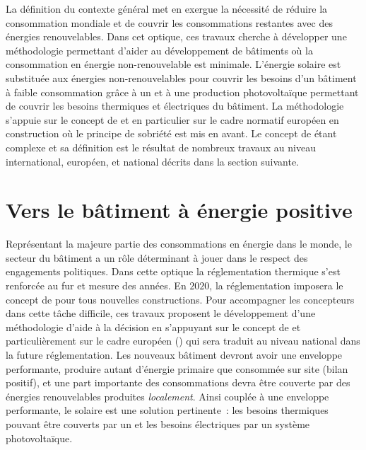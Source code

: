 La définition du contexte général met en exergue la nécessité de réduire la consommation
mondiale et de couvrir les consommations restantes avec des énergies renouvelables. Dans
cet optique, ces travaux cherche à développer une méthodologie permettant d’aider au
développement de bâtiments où la consommation en énergie non-renouvelable est minimale.
L’énergie solaire est substituée aux énergies non-renouvelables pour couvrir les besoins
d’un bâtiment à faible consommation grâce à un  et à une production
photovoltaïque permettant de couvrir les besoins thermiques et électriques du bâtiment. La
méthodologie s’appuie sur le concept de  et en particulier sur le cadre
normatif européen en construction où le principe de sobriété est mis en avant. Le concept
de  étant complexe et sa définition est le résultat de nombreux travaux au
niveau international, européen, et national décrits dans la section suivante.





\section{Vers le bâtiment à énergie positive} %
\label{sec:vers_le_batiment_a_energie_positive}
Représentant la majeure partie des consommations en énergie dans le monde, le secteur
du bâtiment a un rôle déterminant à jouer dans le respect des engagements politiques.
Dans cette optique la réglementation thermique s’est renforcée au fur et mesure des années.
En $2020$, la réglementation imposera le concept de  pour tous
nouvelles constructions.
Pour accompagner les concepteurs dans cette tâche difficile, ces travaux proposent le
développement d’une méthodologie d’aide à la décision en s’appuyant sur le concept de
 et particulièrement sur le cadre européen () qui sera
traduit au niveau national dans la future réglementation. Les nouveaux bâtiment devront
avoir une enveloppe performante, produire autant d’énergie primaire que consommée sur
site (bilan positif), et une part importante des consommations devra être couverte par des énergies
renouvelables produites \emph{localement}. Ainsi couplée à une enveloppe performante, le
solaire est une solution pertinente~: les besoins thermiques pouvant être couverts par un
 et les besoins électriques par un système photovoltaïque.


